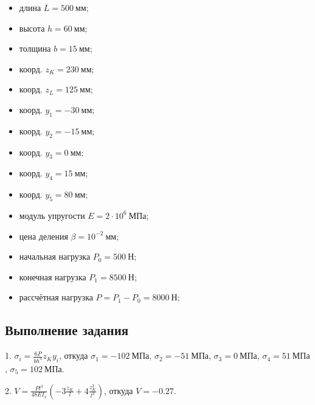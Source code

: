 \begin{itemize}
    \item длина $L = 500~мм$;
    \item высота $h = 60~мм$;
    \item толщина $b = 15~мм$;
    \item коорд. $z_K = 230~мм$;
    \item коорд. $z_L = 125~мм$;
    \item коорд. $y_1 = -30~мм$;
    \item коорд. $y_2 = -15~мм$;
    \item коорд. $y_3 = 0~мм$;
    \item коорд. $y_4 = 15~мм$;
    \item коорд. $y_5 = 80~мм$;
    \item модуль упругости $E = 2 \cdot 10^6~МПа$;
    \item цена деления $\beta = 10^{-2}~мм$;
    \item начальная нагрузка $P_0 = 500~Н$;
    \item конечная нагрузка $P_1 = 8500~Н$;
    \item рассчётная нагрузка $P = P_1 - P_0 = 8000~Н$;
\end{itemize}

\subsection{Выполнение задания}

1. $\sigma_i = \frac{6 P}{b h^3} z_K y_i$, откуда $\sigma_1 = -102~МПа$, $\sigma_2 = -51~МПа$, $\sigma_3 = 0~МПа$, $\sigma_4 = 51~МПа$, $\sigma_5 = 102~МПа$.

2. $V = \frac{P l^3}{48 E I_x} \left(-3 \frac{z_K}{l} + 4 \frac{z_K^3}{l^3}\right)$, откуда $V = -0.27$.

